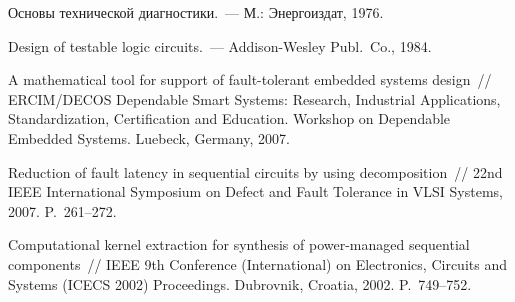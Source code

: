 \begin{multicols}{2}
{{\begin{thebibliography}{99}
Основы технической диагностики.~--- М.: Энергоиздат, 1976.

Design of testable logic circuits.~--- Addison-Wesley Publ.\ Co., 1984.

A mathematical tool for support of fault-tolerant embedded systems design~//
ERCIM/DECOS Dependable Smart Systems: Research, Industrial Applications,
Standardization, Certification and Education.
Workshop on Dependable Embedded Systems. Luebeck, Germany, 2007.

Reduction of fault latency in sequential circuits by using decomposition~//
22nd IEEE International Symposium on Defect and Fault Tolerance in VLSI
Systems, 2007. P.~261--272.


\label{end\stat}

Computational kernel extraction for synthesis of power-managed
sequential components~// IEEE 9th Conference (International) on Electronics,
Circuits and Systems (ICECS 2002) Proceedings. Dubrovnik, Croatia, 2002.
P.~749--752.
 \end{thebibliography}
}
}
\end{multicols}